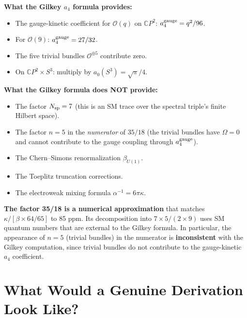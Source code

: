 \documentclass[12pt,a4paper]{article}
\theoremstyle{definition}
\begin{document}
\begin{tcolorbox}[colback=yellow!10!white, colframe=orange!60!black,
  title=\textbf{Verdict: 35/18 Is Not Derived from the Gilkey $a_4$ Formula}]

\textbf{What the Gilkey $a_4$ formula provides:}
\begin{itemize}
\item The gauge-kinetic coefficient for $\mathcal{O}(q)$ on
  $\mathbb{C}P^2$: $a_4^{\rm gauge} = q^2/96$.
\item For $\mathcal{O}(9)$: $a_4^{\rm gauge} = 27/32$.
\item The five trivial bundles $\mathcal{O}^{\oplus 5}$ contribute zero.
\item On $\mathbb{C}P^2 \times S^3$: multiply by $a_0(S^3) = \sqrt{\pi}/4$.
\end{itemize}

\textbf{What the Gilkey formula does NOT provide:}
\begin{itemize}
\item The factor $N_{\rm sp} = 7$ (this is an SM trace over the
  spectral triple's finite Hilbert space).
\item The factor $n = 5$ in the \emph{numerator} of $35/18$ (the
  trivial bundles have $\Omega = 0$ and cannot contribute to the
  gauge coupling through $a_4^{\rm gauge}$).
\item The Chern--Simons renormalization $\beta_{U(1)}$.
\item The Toeplitz truncation corrections.
\item The electroweak mixing formula $\alpha^{-1} = 6\pi\kappa$.
\end{itemize}

\textbf{The factor 35/18 is a numerical approximation} that matches
$\kappa/[\beta \times 64/65]$ to 85 ppm.  Its decomposition into
$7 \times 5/(2 \times 9)$ uses SM quantum numbers that are external
to the Gilkey formula.  In particular, the appearance of $n = 5$
(trivial bundles) in the numerator is \textbf{inconsistent} with
the Gilkey computation, since trivial bundles do not contribute to
the gauge-kinetic $a_4$ coefficient.
\end{tcolorbox}

\section{What Would a Genuine Derivation Look Like?}
\label{sec:genuine}
\end{document}
